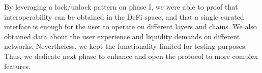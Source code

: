 By leveraging a lock/unlock pattern on phase I, we were able to proof that interoperability can be obtained in the DeFi space, and that a single curated interface is enough for the user to operate on different layers and chains. We also obtained data about the  user experience and liquidity demands on different networks. Nevertheless, we kept the functionality limited for testing purposes. Thus, we dedicate next phase to enhance and open the protocol to more complex features.